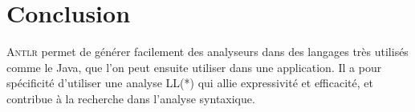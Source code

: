 \documentclass[paper=a4, fontsize=11pt]{scrartcl} %
\numberwithin{equation}{section} %
\numberwithin{figure}{section} %
\numberwithin{table}{section} %
\begin{document}
\section*{Conclusion} %
\textsc{Antlr} permet de générer facilement des analyseurs dans des langages très utilisés comme le Java, que l'on peut ensuite utiliser dans une application. Il a pour spécificité d'utiliser une analyse LL(*) qui allie expressivité et efficacité, et contribue à la recherche dans l'analyse syntaxique.




\end{document}
